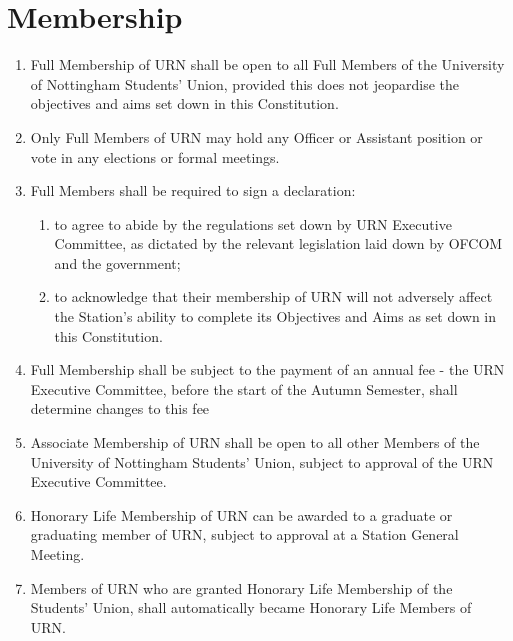 \section{Membership}

\begin{enumerate}[label*=\thesection.\arabic*.]
    \item Full Membership of URN shall be open to all Full Members of the University of Nottingham Students' Union, provided this does not jeopardise the objectives and aims set down in this Constitution.
    \item Only Full Members of URN may hold any Officer or Assistant position or vote in any elections or formal meetings.
    \item \label{itm:revoke-membership}  Full Members shall be required to sign a declaration:
          \begin{enumerate}[label*=\arabic*.]
              \item to agree to abide by the regulations set down by URN Executive Committee, as dictated by the relevant legislation laid down by OFCOM and the government;
              \item to acknowledge that their membership of URN will not adversely affect the Station's ability to complete its Objectives and Aims as set down in this Constitution.
          \end{enumerate}
    \item Full Membership shall be subject to the payment of an annual fee - the URN Executive Committee, before the start of the Autumn Semester, shall determine changes to this fee
    \item Associate Membership of URN shall be open to all other Members of the University of Nottingham Students' Union, subject to approval of the URN Executive Committee.
    \item Honorary Life Membership of URN can be awarded to a graduate or graduating member of URN, subject to approval at a Station General Meeting.
    \item Members of URN who are granted Honorary Life Membership of the Students' Union, shall automatically became Honorary Life Members of URN.
\end{enumerate}
